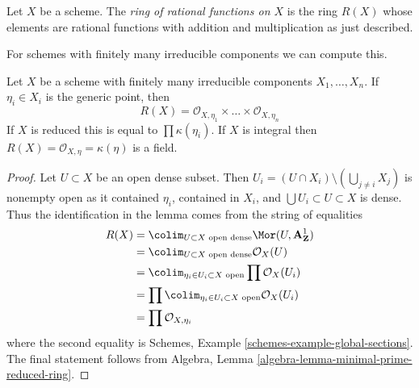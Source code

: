 \begin{definition}
\label{definition-ring-of-rational-functions}
Let $X$ be a scheme. The {\it ring of rational functions on $X$}
is the ring $R(X)$ whose elements are rational functions with
addition and multiplication as just described.
\end{definition}

\noindent
For schemes with finitely many irreducible components we can compute this.

\begin{lemma}
\label{lemma-integral-scheme-rational-functions}
\begin{reference}
\cite[Chapter II, \S 1, no. 36, Proposition 9, pp. 229--230]{FAC}
\end{reference}
Let $X$ be a scheme with finitely many irreducible components
$X_1, \ldots, X_n$. If $\eta_i \in X_i$ is the generic point, then
$$
R(X) = \mathcal{O}_{X, \eta_1} \times \ldots \times \mathcal{O}_{X, \eta_n}
$$
If $X$ is reduced this is equal to $\prod \kappa(\eta_i)$.
If $X$ is integral then $R(X) = \mathcal{O}_{X, \eta} = \kappa(\eta)$
is a field.
\end{lemma}

\begin{proof}
Let $U \subset X$ be an open dense subset. Then
$U_i = (U \cap X_i) \setminus (\bigcup_{j \not = i} X_j)$
is nonempty open as it contained $\eta_i$, contained in $X_i$,
and $\bigcup U_i \subset U \subset X$ is dense.
Thus the identification in the lemma comes from the string of equalities
\begin{align*}
R(X)
& =
\colim_{U \subset X\text{ open dense}} \Mor(U, \mathbf{A}^1_\mathbf{Z}) \\
& =
\colim_{U \subset X\text{ open dense}} \mathcal{O}_X(U) \\
& =
\colim_{\eta_i \in U_i \subset X\text{ open}} \prod \mathcal{O}_X(U_i) \\
& =
\prod \colim_{\eta_i \in U_i \subset X\text{ open}} \mathcal{O}_X(U_i) \\
& =
\prod \mathcal{O}_{X, \eta_i}
\end{align*}
where the second equality is
Schemes, Example \ref{schemes-example-global-sections}.
The final statement follows from
Algebra, Lemma \ref{algebra-lemma-minimal-prime-reduced-ring}.
\end{proof}

